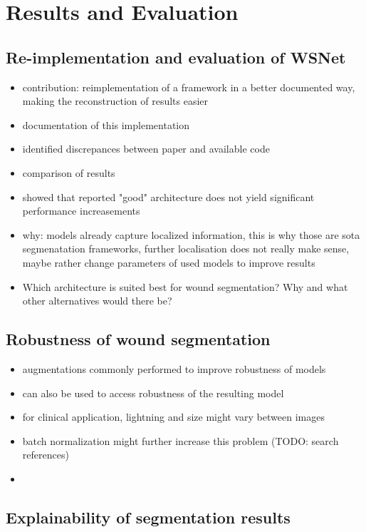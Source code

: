 \section{Results and Evaluation}

\subsection{Re-implementation and evaluation of WSNet}

\begin{itemize}
	\item contribution: reimplementation of a framework in a better documented way, making the reconstruction of results easier
	\item documentation of this implementation
	\item identified discrepances between paper and available code
	\item comparison of results
	\item showed that reported "good" architecture does not yield significant performance increasements
	\item why: models already capture localized information, this is why those are sota segmenatation frameworks, further localisation does not really make sense, maybe rather change parameters of used models to improve results
	\item Which architecture is suited best for wound segmentation? Why and what other alternatives would there be?
\end{itemize}

\subsection{Robustness of wound segmentation}

\begin{itemize}
	\item augmentations commonly performed to improve robustness of models
	\item can also be used to access robustness of the resulting model
	\item for clinical application, lightning and size might vary between images
	\item batch normalization might further increase this problem (TODO: search references)
	\item 
\end{itemize}


\subsection{Explainability of segmentation results}